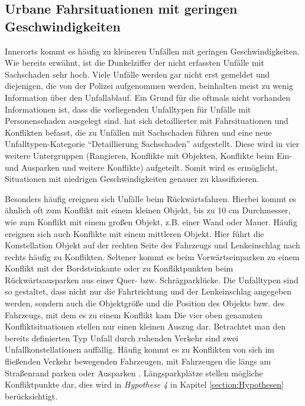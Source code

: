 \subsection{Urbane Fahrsituationen mit geringen Geschwindigkeiten}\label{Urabane Fahrsituationen mit geringen Geschwindigkeiten}
Innerorts kommt es häufig zu kleineren Unfällen mit geringen Geschwindigkeiten. Wie bereits erwähnt, ist die Dunkelziffer der nicht erfassten Unfälle mit Sachschaden sehr hoch. Viele Unfälle werden gar nicht erst gemeldet und diejenigen, die von der Polizei aufgenommen werden, beinhalten meist zu wenig Information über den Unfallablauf. Ein Grund für die oftmals nicht vorhanden Informationen ist, dass die vorliegenden Unfalltypen für Unfälle mit Personenschaden ausgelegt sind. \Textcite[S. 58]{Gschwendtner.2015} hat sich detaillierter mit Fahrsituationen und Konflikten befasst, die zu Unfällen mit Sachschaden führen und eine neue Unfalltypen-Kategorie \enquote{Detaillierung Sachschaden} aufgestellt. Diese wird in vier weitere Untergruppen (Rangieren, Konflikte mit Objekten, Konflikte beim Ein- und Ausparken und weitere Konflikte) aufgeteilt. Somit wird es ermöglicht, Situationen mit niedrigen Geschwindigkeiten genauer zu klassifizieren.

Besonders häufig ereignen sich Unfälle beim Rückwärtsfahren. Hierbei kommt es ähnlich oft zum Konflikt mit einem kleinen Objekt, bis zu 10 cm Durchmesser, wie zum Konflikt mit einem großen Objekt, z.B. einer Wand oder Mauer. Häufig ereignen sich auch Konflikte mit einem mittleren Objekt. Hier führt die Konstellation Objekt auf der rechten Seite des Fahrzeugs und Lenkeinschlag nach rechts häufig zu Konflikten. Seltener kommt es beim Vorwärtseinparken zu einem Konflikt mit der Bordsteinkante oder zu Konfliktpunkten beim Rückwärtsausparken aus einer Quer- bzw. Schrägparklücke. Die Unfalltypen sind so gestaltet, dass nicht nur die Fahrtrichtung und der Lenkeinschlag angegeben werden, sondern auch die Objektgröße und die Position des Objekts bzw. des Fahrzeugs, mit dem es zu einem Konflikt kam \parencite[S. 58-61]{Gschwendtner.2015} Die vier oben genannten Konfliktsituationen stellen nur einen kleinen Auszug dar. Betrachtet man den bereits definierten Typ Unfall durch ruhenden Verkehr sind zwei Unfallkonstellationen auffällig. Häufig kommt es zu Konflikten von sich im fließenden Verkehr bewegenden Fahrzeugen, mit  Fahrzeugen die längs am Straßenrand parken oder Ausparken \parencite[S. 53]{Vollrath.2006}. Längsparkplätze stellen mögliche Konfliktpunkte dar, dies wird in \textit{Hypothese 4} in Kapitel \ref{section:Hypothesen} berücksichtigt.

